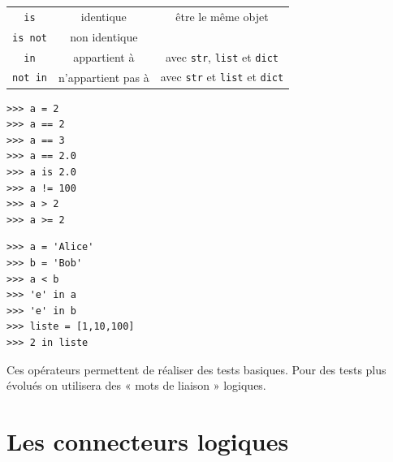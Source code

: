 {\begin{tabular}{CCC}
	\texttt{is}                                      & identique                             & être le même objet                                                                                    \\

	\texttt{is not}                                  & non identique                         &                                                                                                       \\

	\texttt{in}                                      & appartient à                          & avec \texttt{str}, \texttt{list} et \texttt{dict}                                   \\

	\texttt{not in}                                  & n'appartient pas à                    & avec \texttt{str} et \texttt{list} et \texttt{dict}                                 \\
\end{tabular}
}\normalsize

\begin{pys}
	\begin{verbatim}
>>> a = 2
>>> a == 2
>>> a == 3
>>> a == 2.0
>>> a is 2.0
>>> a != 100
>>> a > 2
>>> a >= 2
    \end{verbatim}
\end{pys}

\begin{pys}
	\begin{verbatim}
>>> a = 'Alice'
>>> b = 'Bob'
>>> a < b
>>> 'e' in a
>>> 'e' in b
>>> liste = [1,10,100]
>>> 2 in liste
    \end{verbatim}
\end{pys}

Ces opérateurs permettent de réaliser des tests basiques. Pour des tests plus évolués on utilisera des « mots de liaison »  logiques.

\section{Les connecteurs logiques}

